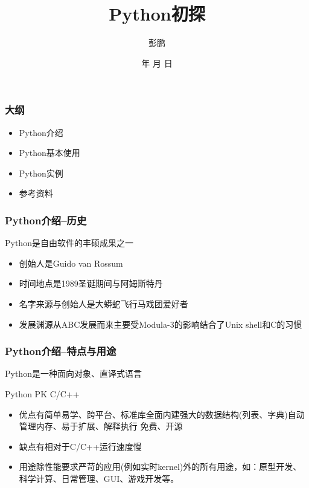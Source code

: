 \documentclass[xcolor=dvipsnames]{beamer}
\renewcommand{\today}{\number\year 年 \number\month 月 \number\day 日}
\begin{document}
\title{Python初探}
\author{彭鹏}

\date{\today}
\begin{frame}
    \titlepage
\end{frame}

\begin{frame}
    \frametitle{大纲}
    \begin{itemize}[<+->]
        \item
            Python介绍
        \item
            Python基本使用
        \item
            Python实例
        \item
            参考资料
    \end{itemize} 
\end{frame}

\begin{frame}
    \frametitle{Python介绍--历史}
    Python是自由软件的丰硕成果之一
    \begin{itemize}[<+->]
        \item 
            \alert{创始人}是Guido van Rossum
        \item
            \alert{时间地点}是1989圣诞期间与阿姆斯特丹
        \item
            \alert{名字来源}与创始人是大蟒蛇飞行马戏团爱好者
        \item
            \alert{发展渊源}从ABC发展而来主要受Modula-3的影响结合了Unix shell和C的习惯
    \end{itemize} 
\end{frame}

\begin{frame}
    \frametitle{Python介绍--特点与用途}
    Python是一种面向对象、直译式语言 
    
    Python PK C/C++
    \begin{itemize}[<+->]
        \item 
            \alert{优点}有简单易学、跨平台、标准库全面内建强大的数据结构(列表、字典)自动管理内存、易于扩展、解释执行 免费、开源
        \item
            \alert{缺点}有相对于C/C++运行速度慢
        \item
            \alert{用途}除性能要求严苛的应用(例如实时kernel)外的所有用途，如：原型开发、科学计算、日常管理、GUI、游戏开发等。
    \end{itemize} 
\end{frame}
\end{document}
